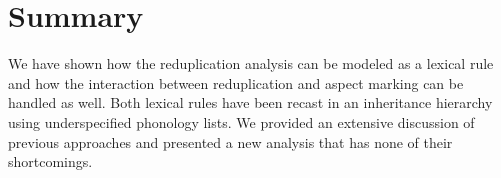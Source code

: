 \documentclass[
a4paper,
10pt,
oneside,
]{scrartcl}
\begin{document}
\section{Summary}

We have shown how the reduplication analysis can be modeled as a lexical rule and how the
interaction between reduplication and aspect marking can be handled as well. Both lexical rules have
been recast in an inheritance hierarchy using underspecified phonology lists. We provided an
extensive discussion of previous approaches and presented a new analysis that has none of their shortcomings. 

\printbibliography
\end{document}
